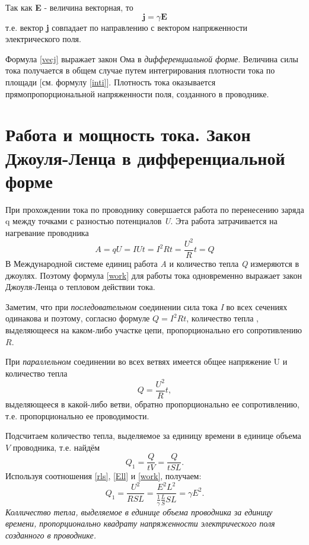 \documentclass[a4paper,10pt]{book}
\let\vec\mathbf
\begin{document}
Так как \textbf{E} - величина векторная, то
\begin{equation}\label{vecj}
 \vec{j} = \gamma\vec{E}
\end{equation}
т.е. вектор \textbf{j} совпадает по направлению с вектором напряженности электрического поля.

Формула \ref{vecj} выражает закон Ома в \emph{дифференциальной форме}. Величина силы тока получается в общем случае путем интегрирования
плотности тока по площади [см. формулу \ref{inti}]. Плотность тока оказывается прямопропорциональной напряженности поля, созданного в проводнике.
\section{Работа и мощность тока. Закон Джоуля-Ленца в дифференциальной форме}
При прохождении тока по проводнику совершается работа по перенесению заряда q между точками с разностью потенциалов \emph{U}. Эта работа 
затрачивается на нагревание проводника
\begin{equation}\label{work}
 A = qU = IUt = I^2Rt = \frac{U^2}{R}t = Q
\end{equation}
В Международной системе единиц работа \emph{A} и количество тепла \emph{Q} измеряются в джоулях. Поэтому формула \ref{work} для работы 
тока одновременно выражает закон Джоуля-Ленца о тепловом действии тока. 

Заметим, что при \emph{последовательном} соединении сила тока \emph{I} во всех сечениях одинакова и поэтому, согласно формуле $Q = I^2Rt$,
количество тепла , выделяющееся на каком-либо участке цепи, пропорционально его сопротивлению $R$.

При \emph{параллельном} соединении во всех ветвях имеется общее напряжение U и количество тепла
\begin{equation*}
 Q = \frac{U^2}{R}t,
\end{equation*}
выделяющееся в какой-либо ветви, обратно пропорционально ее сопротивлению, т.е. пропорционально ее проводимости.

Подсчитаем количество тепла, выделяемое за единицу времени в единице объема $V$ проводника, т.е. найдём 
\begin{equation*}
 Q_1 = \frac{Q}{tV} = \frac{Q}{tSL}. 
\end{equation*}
Используя соотношения \ref{rls}, \ref{Ell} и \ref{work}, получаем:
\begin{equation}\label{warm}
 Q_1 = \frac{U^2}{RSL} = \frac{E^2L^2}{\frac{1}{\gamma}\frac{L}{S}SL} = \gamma E^2.
\end{equation}
\emph{Колличество тепла, выделяемое в единице объема проводника за единицу времени, пропорционально квадрату напряженности электрического поля созданного в проводнике.}
\end{document}
